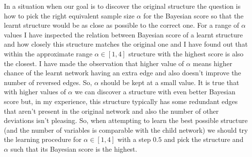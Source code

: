 \documentclass[english,cover]{fitthesis} %
\begin{document}
\medskip
In a situation when our goal is to discover the original structure the question is how to pick the right equivalent sample size $\alpha$ for the Bayesian score so that the learnt structure would be as close as possible to the correct one. For a range of $\alpha$ values I have inspected the relation between Bayesian score of a learnt structure and how closely this structure matches the original one and I have found out that within the approximate range $\alpha \in [1,4]$ structure with the highest score is also the closest. 
I have made the observation that higher value of $\alpha$ means higher chance of the learnt network having an extra edge and also doesn't improve the number of reversed edges. So, $\alpha$ should be kept at a small value.
It is true that with higher values of $\alpha$ we can discover a structure with even better Bayesian score but, in my experience, this structure typically has some redundant edges that aren't present in the original network and also the number of other deviations isn't pleasing. So, when attempting to learn the best possible structure (and the number of variables is comparable with the child network) we should try the learning procedure for $\alpha \in [1,4]$ with a step $0.5$ and pick the structure and $\alpha$ such that its Bayesian score is the highest.
\end{document}
